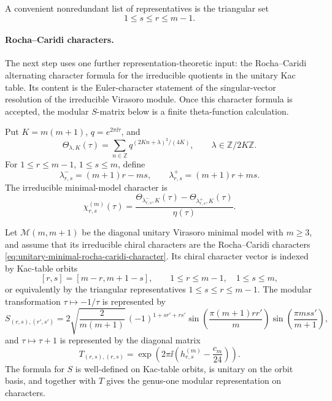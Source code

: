 A convenient nonredundant list of representatives is the triangular set
\[
  1\le s\le r\le m-1.
\]

\paragraph{Rocha--Caridi characters.}
The next step uses one further representation-theoretic input: the
Rocha--Caridi alternating character formula for the irreducible quotients in
the unitary Kac table.  Its content is the Euler-character statement of the
singular-vector resolution of the irreducible Virasoro module.  Once this
character formula is accepted, the modular \(S\)-matrix below is a finite
theta-function calculation.

Put \(K=m(m+1)\), \(q=e^{2\pi\ii\tau}\), and
\[
  \Theta_{\lambda,K}(\tau)
  =
  \sum_{n\in\mathbb Z}
  q^{(2Kn+\lambda)^2/(4K)},
  \qquad
  \lambda\in\mathbb Z/2K\mathbb Z .
\]
For \(1\le r\le m-1\), \(1\le s\le m\), define
\[
  \lambda^-_{r,s}=(m+1)r-ms,
  \qquad
  \lambda^+_{r,s}=(m+1)r+ms .
\]
The irreducible minimal-model character is
\begin{equation}
  \chi_{r,s}^{(m)}(\tau)
  =
  \frac{
  \Theta_{\lambda^-_{r,s},K}(\tau)
  -
  \Theta_{\lambda^+_{r,s},K}(\tau)}
  {\eta(\tau)} .
  \label{eq:unitary-minimal-rocha-caridi-character}
\end{equation}

\begin{proposition}
\label{prop:unitary-minimal-model-modular-data}
Let \(\mathcal M(m,m+1)\) be the diagonal unitary Virasoro minimal model
with \(m\ge3\), and assume that its irreducible chiral characters are the
Rocha--Caridi characters
\eqref{eq:unitary-minimal-rocha-caridi-character}.  Its chiral character
vector is indexed by Kac-table orbits
\[
  [r,s]=[m-r,m+1-s],
  \qquad
  1\le r\le m-1,\quad 1\le s\le m,
\]
or equivalently by the triangular representatives \(1\le s\le r\le m-1\).
The modular transformation \(\tau\mapsto-1/\tau\) is represented by
\begin{equation}
  S_{(r,s),(r',s')}
  =
  2\sqrt{\frac{2}{m(m+1)}}\,
  (-1)^{1+sr'+rs'}
  \sin\!\left(\frac{\pi(m+1)rr'}{m}\right)
  \sin\!\left(\frac{\pi mss'}{m+1}\right),
  \label{eq:unitary-minimal-model-s-matrix}
\end{equation}
and \(\tau\mapsto\tau+1\) is represented by the diagonal matrix
\begin{equation}
  T_{(r,s),(r,s)}
  =
  \exp\!\left(2\pi\ii\left(h_{r,s}^{(m)}-\frac{c_m}{24}\right)\right).
  \label{eq:unitary-minimal-model-t-matrix}
\end{equation}
The formula for \(S\) is well-defined on Kac-table orbits, is unitary on the
orbit basis, and together with \(T\) gives the genus-one modular
representation on characters.
\end{proposition}

